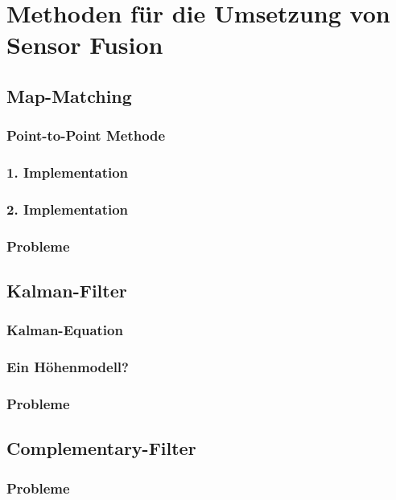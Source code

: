 \chapter{Methoden für die Umsetzung von Sensor Fusion}

\section{Map-Matching}

\subsection{Point-to-Point Methode}

\subsection{1. Implementation}

\subsection{2. Implementation}

\subsection{Probleme}

\section{Kalman-Filter}

\subsection{Kalman-Equation}

\subsection{Ein Höhenmodell?}

\subsection{Probleme}

\section{Complementary-Filter}

\subsection{Probleme}